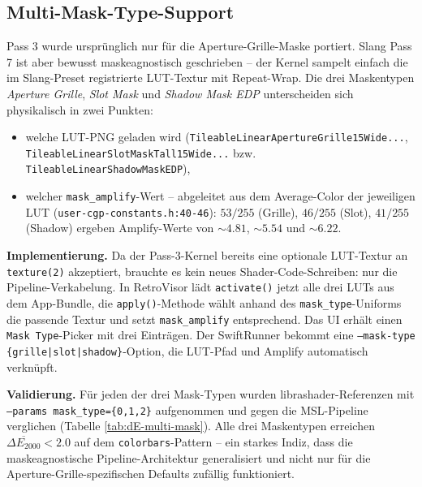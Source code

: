 \documentclass[11pt, a4paper]{article}
\begin{document}
\subsection{Multi-Mask-Type-Support}
\vspace{.5cm}
Pass 3 wurde urspr\"unglich nur f\"ur die Aperture-Grille-Maske portiert. Slang Pass 7 ist aber bewusst maskeagnostisch geschrieben -- der Kernel sampelt einfach die im Slang-Preset registrierte LUT-Textur mit Repeat-Wrap. Die drei Maskentypen \emph{Aperture Grille}, \emph{Slot Mask} und \emph{Shadow Mask EDP} unterscheiden sich physikalisch in zwei Punkten:
\begin{itemize}[leftmargin=*, nosep]
    \item welche LUT-PNG geladen wird (\texttt{TileableLinearApertureGrille15Wide...}, \texttt{TileableLinearSlotMaskTall15Wide...} bzw. \texttt{TileableLinearShadowMaskEDP}),
    \item welcher \texttt{mask\_amplify}-Wert -- abgeleitet aus dem Average-Color der jeweiligen LUT (\texttt{user-cgp-constants.h:40-46}): $53/255$ (Grille), $46/255$ (Slot), $41/255$ (Shadow) ergeben Amplify-Werte von $\sim 4.81$, $\sim 5.54$ und $\sim 6.22$.
\end{itemize}

\vspace{.5cm}
\textbf{Implementierung.} Da der Pass-3-Kernel bereits eine optionale LUT-Textur an \texttt{texture(2)} akzeptiert, brauchte es kein neues Shader-Code-Schreiben: nur die Pipeline-Verkabelung. In RetroVisor lädt \texttt{activate()} jetzt alle drei LUTs aus dem App-Bundle, die \texttt{apply()}-Methode w\"ahlt anhand des \texttt{mask\_type}-Uniforms die passende Textur und setzt \texttt{mask\_amplify} entsprechend. Das UI erh\"alt einen \texttt{Mask Type}-Picker mit drei Eintr\"agen. Der SwiftRunner bekommt eine \texttt{--mask-type \{grille|slot|shadow\}}-Option, die LUT-Pfad und Amplify automatisch verkn\"upft.

\vspace{.5cm}
\textbf{Validierung.} F\"ur jeden der drei Mask-Typen wurden librashader-Referenzen mit \texttt{--params mask\_type=\{0,1,2\}} aufgenommen und gegen die MSL-Pipeline verglichen (Tabelle \ref{tab:dE-multi-mask}). Alle drei Maskentypen erreichen $\overline{\Delta E_{2000}} < 2.0$ auf dem \texttt{colorbars}-Pattern -- ein starkes Indiz, dass die maskeagnostische Pipeline-Architektur generalisiert und nicht nur f\"ur die Aperture-Grille-spezifischen Defaults zuf\"allig funktioniert.
\end{document}
